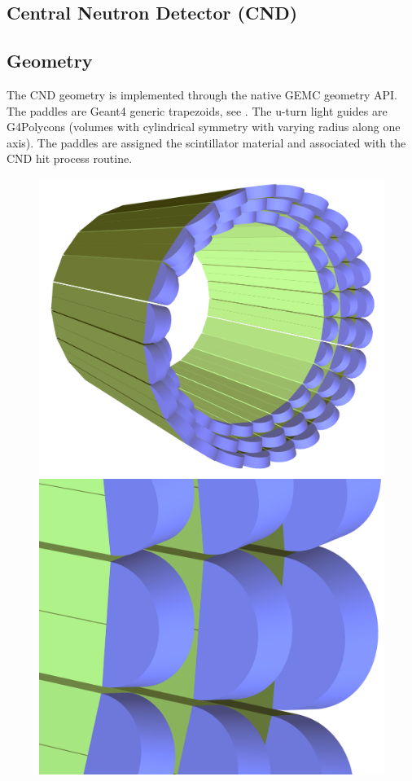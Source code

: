 \subsection{Central Neutron Detector (CND)}

\subsection{Geometry}

The CND geometry is implemented through the native GEMC geometry API.
The paddles are Geant4 generic trapezoids, see . The u-turn light guides are G4Polycons (volumes with cylindrical symmetry
with varying radius along one axis).
The paddles are assigned the scintillator material and associated with the CND hit process routine.

\begin{figure}
	\centering
	\includegraphics[width=0.99\columnwidth,keepaspectratio]{img/cndGeometry.png}
	\includegraphics[width=0.99\columnwidth,keepaspectratio]{img/cndDetail.png}

\end{figure}
